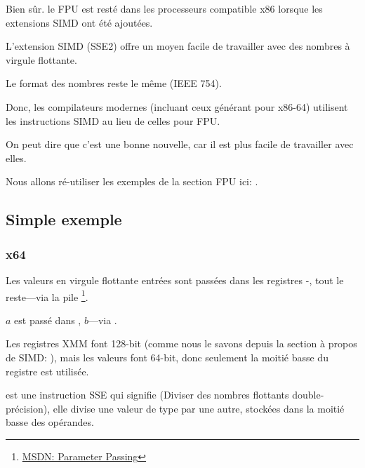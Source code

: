 
\label{floating_SIMD}

Bien sûr. le \ac{FPU} est resté dans les processeurs compatible x86 lorsque les extensions
\ac{SIMD} ont été ajoutées.

L'extension \ac{SIMD} (SSE2) offre un moyen facile de travailler avec des nombres
à virgule flottante.

Le format des nombres reste le même (IEEE 754).

Donc, les compilateurs modernes (incluant ceux générant pour x86-64) utilisent les
instructions \ac{SIMD} au lieu de celles pour FPU.

On peut dire que c'est une bonne nouvelle, car il est plus facile de travailler avec
elles.

Nous allons ré-utiliser les exemples de la section FPU ici: .

\subsection{Simple exemple}



\subsubsection{x64}



Les valeurs en virgule flottante entrées sont passées dans les registres -,
tout le reste---via la pile
\footnote{\href{http://go.yurichev.com/17263}{MSDN: Parameter Passing}}.

$a$ est passé dans , $b$---via .

Les registres XMM font 128-bit (comme nous le savons depuis la section à propos de
\ac{SIMD}: ), mais les valeurs \Tdouble font 64-bit, donc seulement
la moitié basse du registre est utilisée.

 est une instruction SSE qui signifie  (Diviser des nombres flottants double-précision), elle divise
une valeur de type \Tdouble par une autre, stockées dans la moitié basse des opérandes.

